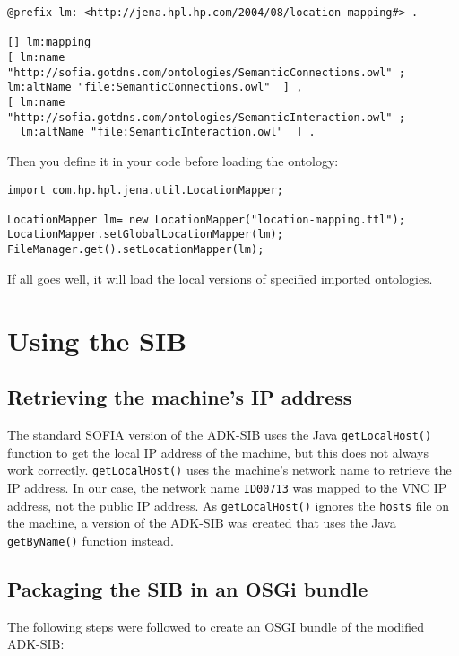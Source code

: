 \begin{verbatim}
@prefix lm: <http://jena.hpl.hp.com/2004/08/location-mapping#> . 

[] lm:mapping 
[ lm:name 
"http://sofia.gotdns.com/ontologies/SemanticConnections.owl" ; 
lm:altName "file:SemanticConnections.owl"  ] , 
[ lm:name 
"http://sofia.gotdns.com/ontologies/SemanticInteraction.owl" ; 
  lm:altName "file:SemanticInteraction.owl"  ] . 
\end{verbatim}

Then you define it in your code before loading the ontology: 

\begin{verbatim}
import com.hp.hpl.jena.util.LocationMapper; 

LocationMapper lm= new LocationMapper("location-mapping.ttl"); 
LocationMapper.setGlobalLocationMapper(lm); 
FileManager.get().setLocationMapper(lm);
\end{verbatim}

If all goes well, it will load the local versions of specified imported ontologies.

\section{Using the SIB}

\subsection{Retrieving the machine's IP address}
The standard SOFIA version of the ADK-SIB uses the Java \texttt{get\-LocalHost()} function to get the local IP address of the machine, but this does not always work correctly. \texttt{getLocalHost()} uses the machine's network name to retrieve the IP address. In our case, the network name \texttt{ID00713} was mapped to the VNC IP address, not the public IP address. As \texttt{getLocalHost()} ignores the \texttt{hosts} file on the machine, a version of the ADK-SIB was created that uses the Java \texttt{getByName()} function instead.

\subsection{Packaging the SIB in an OSGi bundle}
The following steps were followed to create an OSGI bundle of the modified ADK-SIB:

